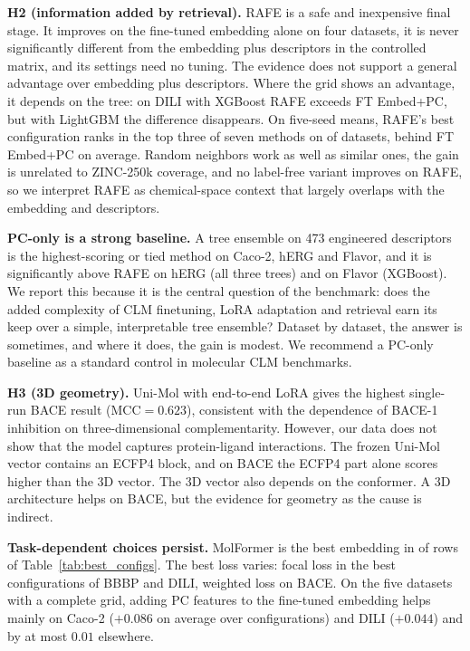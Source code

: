 \documentclass[pdflatex,sn-mathphys-num,Numbered]{sn-jnl}%
\begin{document}
\textbf{H2 (information added by retrieval).} RAFE is a safe and inexpensive final stage. It improves on the fine-tuned embedding alone on four datasets, it is never significantly different from the embedding plus descriptors in the controlled matrix, and its settings need no tuning. The evidence does not support a general advantage over embedding plus descriptors. Where the grid shows an advantage, it depends on the tree: on DILI with XGBoost RAFE exceeds FT Embed+PC, but with LightGBM the difference disappears. On five-seed means, RAFE's best configuration ranks in the top three of seven methods on \ntop{} of \nds{} datasets, behind FT Embed+PC on average. Random neighbors work as well as similar ones, the gain is unrelated to ZINC-250k coverage, and no label-free variant improves on RAFE, so we interpret RAFE as chemical-space context that largely overlaps with the embedding and descriptors.

\textbf{PC-only is a strong baseline.} A tree ensemble on 473 engineered descriptors is the highest-scoring or tied method on Caco-2, hERG and Flavor, and it is significantly above RAFE on hERG (all three trees) and on Flavor (XGBoost). We report this because it is the central question of the benchmark: does the added complexity of CLM finetuning, LoRA adaptation and retrieval earn its keep over a simple, interpretable tree ensemble? Dataset by dataset, the answer is sometimes, and where it does, the gain is modest. We recommend a PC-only baseline as a standard control in molecular CLM benchmarks.

\textbf{H3 (3D geometry).} Uni-Mol with end-to-end LoRA gives the highest single-run BACE result (MCC$=0.623$), consistent with the dependence of BACE-1 inhibition on three-dimensional complementarity. However, our data does not show that the model captures protein-ligand interactions. The frozen Uni-Mol vector contains an ECFP4 block, and on BACE the ECFP4 part alone scores higher than the 3D vector. The 3D vector also depends on the conformer. A 3D architecture helps on BACE, but the evidence for geometry as the cause is indirect.

\textbf{Task-dependent choices persist.} MolFormer is the best embedding in \nmf{} of \nrows{} rows of Table~\ref{tab:best_configs}. The best loss varies: focal loss in the best configurations of BBBP and DILI, weighted loss on BACE. On the five datasets with a complete grid, adding PC features to the fine-tuned embedding helps mainly on Caco-2 ($+0.086$ on average over configurations) and DILI ($+0.044$) and by at most $0.01$ elsewhere.
\end{document}
